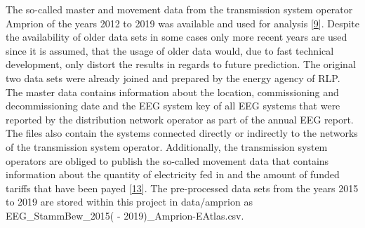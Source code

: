 \documentclass[a4paper,11pt]{article}
\begin{document}
The so-called master and movement data from the transmission system operator Amprion of the years 2012 to 2019 was available and used for analysis {[}\protect\hyperlink{ref-EnergieagenturRheinlandPfalz.2021}{9}{]}. Despite the availability of older data sets in some cases only more recent years are used since it is assumed, that the usage of older data would, due to fast technical development, only distort the results in regards to future prediction. The original two data sets were already joined and prepared by the energy agency of RLP. The master data contains information about the location, commissioning and decommissioning date and the EEG system key of all EEG systems that were reported by the distribution network operator as part of the annual EEG report. The files also contain the systems connected directly or indirectly to the networks of the transmission system operator. Additionally, the transmission system operators are obliged to publish the so-called movement data that contains information about the quantity of electricity fed in and the amount of funded tariffs that have been payed {[}\protect\hyperlink{ref-AmprionGmbH.2019}{13}{]}. The pre-processed data sets from the years 2015 to 2019 are stored within this project in data/amprion as EEG\_StammBew\_2015( - 2019)\_Amprion-EAtlas.csv.
\end{document}
